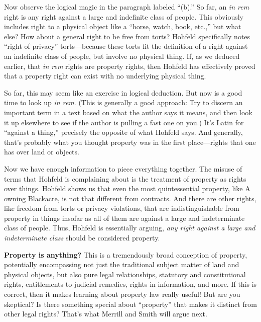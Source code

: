 Now observe the logical magic in the paragraph labeled ``(b).''
So far, an \emph{in rem} right is any right against a large
and indefinite class of people. This obviously includes right to a physical
object like a ``horse, watch, book, etc.,'' but what else? How about a general
right to be free from torts? Hohfeld specifically notes ``right of privacy''
torts---because these torts fit the definition of a right against an indefinite
class of people, but involve no physical thing. If, as we deduced earlier, that
\emph{in rem} rights are property rights, then Hohfeld has effectively proved
that a property right can exist with no underlying physical thing.

So far, this may seem like an exercise in logical deduction. But now is a
good time to look up \emph{in rem}. (This is generally a good
approach: Try to discern an important term in a text based on what the author
says it means, and then look it up elsewhere to see if the author is pulling a
fast one on you.) It's Latin for ``against a thing,'' precisely the opposite of
what Hohfeld says. And generally, that's probably what you thought property
was in the first place---rights that one has over land or objects.

Now we have enough information to piece everything together. The misuse of terms
that Hohfeld is complaining about is the treatment of property as rights over
things. Hohfeld shows us that even the most quintessential property, like A
owning Blackacre, is not that different from contracts. And there are other
rights, like freedom from torts or privacy violations, that are
indistinguishable from property in things insofar as all of them are against a
large and indeterminate class of people. Thus, Hohfeld is essentially arguing,
\emph{any right against a large and indeterminate class} should be considered
property.

\item \textbf{Property is anything?}
This is a tremendously broad conception of property, potentially encompassing
not just the traditional subject matter of land and physical objects, but also
pure legal relationships, statutory and constitutional rights, entitlements to
judicial remedies, rights in information, and more. If this is correct, then it
makes learning about property law really useful! But are you skeptical? Is there
something special about ``property'' that makes it distinct from other legal
rights? That's what Merrill and Smith will argue next.


